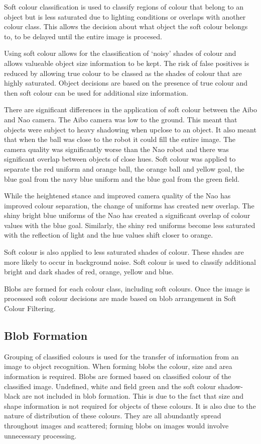 Soft colour classification is used to classify regions of colour that belong to an object but is less saturated due to lighting conditions or overlaps with another colour class. This allows the decision about what object the soft colour belongs to, to be delayed until the entire image is procesed.

Using soft colour allows for the classification of `noisy' shades of colour and allows valueable object size information to be kept. The risk of false positives is reduced by allowing true colour to be classed as the shades of colour that are highly saturated. Object decisions are based on the presence of true colour and then soft colour can be used for additional size information.

There are significant differences in the application of soft colour between the Aibo and Nao camera. The Aibo camera was low to the ground. This meant that objects were subject to heavy shadowing when upclose to an object. It also meant that when the ball was close to the robot it could fill the entire image. The camera quality was significantly worse than the Nao robot and there was significant overlap between objects of close hues. Soft colour was applied to separate the red uniform and orange ball, the orange ball and yellow goal, the blue goal from the navy blue uniform and the blue goal from the green field. 

While the heightened stance and improved camera quality of the Nao has improved colour separation, the change of uniforms has created new overlap. The shiny bright blue uniforms of the Nao has created a significant overlap of colour values with the blue goal. Similarly, the shiny red uniforms become less saturated with the reflection of light and the hue values shift closer to orange.

Soft colour is also applied to less saturated shades of colour. These shades are more likely to occur in background noise. Soft colour is used to classify additional bright and dark shades of red, orange, yellow and blue. 
 
Blobs are formed for each colour class, including soft colours. Once the image is processed soft colour decisions are made based on blob arrangement in Soft Colour Filtering. 

\subsection{Blob Formation}

Grouping of classified colours is used for the transfer of information from an image to object recognition. When forming blobs the colour, size and area information is required. Blobs are formed based on classified colour of the classified image. Undefined, white and field green and the soft colour shadow-black are not included in blob formation. This is due to the fact that size and shape information is not required for objects of these colours. It is also due to the nature of distribution of these colours. They are all abundantly spread throughout images and scattered; forming blobs on images would involve unnecessary processing. 


